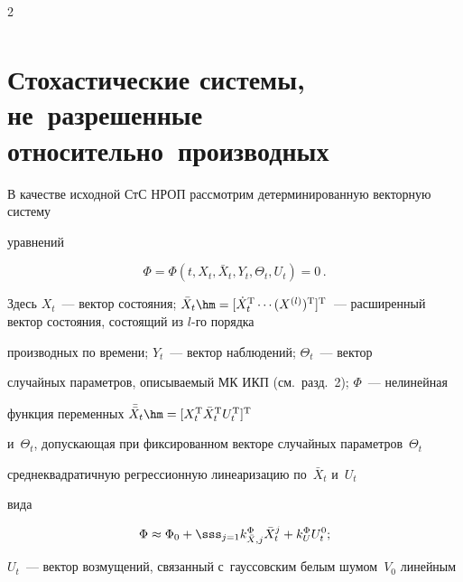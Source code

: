 \begin{multicols}{2}
\begin{align*}

\end{align*}





\section{Стохастические системы, не~разрешенные относительно~производных}





В качестве исходной СтС НРОП рассмотрим детерминированную  векторную сис\-те\-му 

уравнений

   \begin{equation}

   \Phi = \Phi \left( t, X_t, \bar X_t, Y_t, \Theta_t, U_t\right) =0\,.

    \label{e3.1-s2}

    \end{equation}

Здесь $X_t$~--- вектор состояния; $\bar X_t\hm= [ \dot X_t^{\mathrm{T}} \cdots 

(X^{(l)})^{\mathrm{T}}]^{\mathrm{T}}$~--- расширенный вектор со\-сто\-яния, со\-сто\-ящий из $l$-го порядка 

производных по времени; $Y_t$~--- вектор наблюдений; $\Theta_t$~--- вектор 

случайных па\-ра\-мет\-ров, опи\-сы\-ва\-емый МК ИКП (см.\ разд.~2); $\Phi$~--- нелинейная 

функция переменных  $\bar{\bar X}_t \hm= [ X_t^{\mathrm{T}} \bar X_t^{\mathrm{T}} U_t^{\mathrm{T}}]^{\mathrm{T}}$ 

и~$\Theta_t$, до\-пус\-ка\-ющая при фиксированном векторе случайных па\-ра\-мет\-ров~$\Theta_t$ 

среднеквадратичную регрессионную линеаризацию по~$\bar X_t$  и~$U_t$ 

вида

      \begin{equation*}

    \Phi\approx \Phi_0 + \sss_{j=1} k_{\bar X,j}^\Phi \bar X_t^j + k_U^\Phi U_t^0;


\end{equation*}

$U_t$~--- вектор возмущений, связанный с~гауссовским белым шумом~$V_0$ линейным 


\end{multicols}
